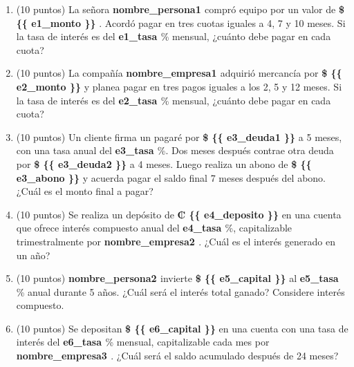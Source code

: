 \begin{enumerate}[leftmargin=*, label=\textbf{\arabic*.}]
  \item (10 puntos) La señora \textbf{ {{ nombre_persona1 }} } compró equipo por un valor de \textbf{\$\num{ {{ e1_monto }} }}. Acordó pagar en tres cuotas iguales a 4, 7 y 10 meses. Si la tasa de interés es del \textbf{ {{ e1_tasa }} }\% mensual, ¿cuánto debe pagar en cada cuota?

  \vspace{0.5cm}

  \item (10 puntos) La compañía \textbf{ {{ nombre_empresa1 }} } adquirió mercancía por \textbf{\$\num{ {{ e2_monto }} }} y planea pagar en tres pagos iguales a los 2, 5 y 12 meses. Si la tasa de interés es del \textbf{ {{ e2_tasa }} }\% mensual, ¿cuánto debe pagar en cada cuota?

  \vspace{0.5cm}

  \item (10 puntos) Un cliente firma un pagaré por \textbf{\$\num{ {{ e3_deuda1 }} }} a 5 meses, con una tasa anual del \textbf{ {{ e3_tasa }} }\%. Dos meses después contrae otra deuda por \textbf{\$\num{ {{ e3_deuda2 }} }} a 4 meses. Luego realiza un abono de \textbf{\$\num{ {{ e3_abono }} }} y acuerda pagar el saldo final 7 meses después del abono. ¿Cuál es el monto final a pagar?

  \vspace{0.5cm}

  \item (10 puntos) Se realiza un depósito de \textbf{₡\num{ {{ e4_deposito }} }} en una cuenta que ofrece interés compuesto anual del \textbf{ {{ e4_tasa }} }\%, capitalizable trimestralmente por \textbf{ {{ nombre_empresa2 }} }. ¿Cuál es el interés generado en un año?

  \vspace{0.5cm}

  \item (10 puntos) \textbf{ {{ nombre_persona2 }} } invierte \textbf{\$\num{ {{ e5_capital }} }} al \textbf{ {{ e5_tasa }} }\% anual durante 5 años. ¿Cuál será el interés total ganado? Considere interés compuesto.

  \vspace{0.5cm}

  \item (10 puntos) Se depositan \textbf{\$\num{ {{ e6_capital }} }} en una cuenta con una tasa de interés del \textbf{ {{ e6_tasa }} }\% mensual, capitalizable cada mes por \textbf{ {{ nombre_empresa3 }} }. ¿Cuál será el saldo acumulado después de 24 meses?
\end{enumerate}



